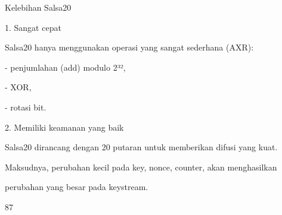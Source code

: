 \documentclass{article}
\begin{document}

Kelebihan Salsa20

1. Sangat cepat

Salsa20 hanya menggunakan operasi yang sangat sederhana (AXR):

- penjumlahan (add) modulo 2³², 

- XOR, 

- rotasi bit.

2. Memiliki keamanan yang baik

Salsa20 dirancang dengan 20 putaran untuk memberikan difusi yang kuat. 

Maksudnya, perubahan kecil pada key, nonce, counter, akan menghasilkan 

perubahan yang besar pada keystream.

87
\end{document}
